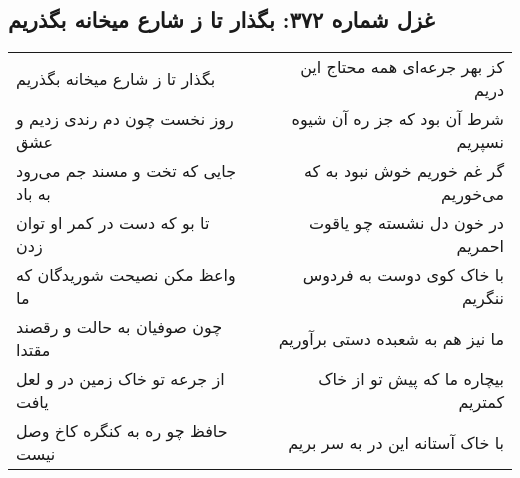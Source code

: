 \begin{center}
\section*{غزل شماره ۳۷۲: بگذار تا ز شارع میخانه بگذریم}
\label{sec:sh372}
\begin{longtable}{l p{0.5cm} r}
بگذار تا ز شارع میخانه بگذریم
&&
کز بهر جرعه‌ای همه محتاج این دریم
\\
روز نخست چون دم رندی زدیم و عشق
&&
شرط آن بود که جز ره آن شیوه نسپریم
\\
جایی که تخت و مسند جم می‌رود به باد
&&
گر غم خوریم خوش نبود به که می‌خوریم
\\
تا بو که دست در کمر او توان زدن
&&
در خون دل نشسته چو یاقوت احمریم
\\
واعظ مکن نصیحت شوریدگان که ما
&&
با خاک کوی دوست به فردوس ننگریم
\\
چون صوفیان به حالت و رقصند مقتدا
&&
ما نیز هم به شعبده دستی برآوریم
\\
از جرعه تو خاک زمین در و لعل یافت
&&
بیچاره ما که پیش تو از خاک کمتریم
\\
حافظ چو ره به کنگره کاخ وصل نیست
&&
با خاک آستانه این در به سر بریم
\\
\end{longtable}
\end{center}
